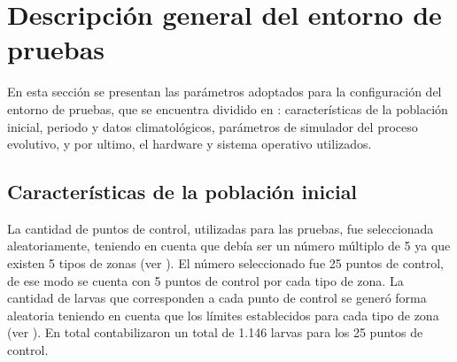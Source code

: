 \section{Descripción general del entorno de pruebas}
En esta sección se presentan las parámetros adoptados para la configuración del entorno de
pruebas, que se encuentra dividido en : características de la población inicial, periodo y datos
climatológicos, parámetros de simulador del proceso evolutivo, y por ultimo, el hardware y sistema
operativo utilizados.

\subsection{Características de la población inicial}
La cantidad de puntos de control, utilizadas para las pruebas, fue seleccionada aleatoriamente,
teniendo en cuenta que debía ser un número múltiplo de 5 ya que existen 5 tipos de zonas
(ver ). El número seleccionado fue 25 puntos de control, de ese
modo se cuenta con 5 puntos de control por cada tipo de zona. La cantidad de larvas que
corresponden a cada punto de control se generó forma aleatoria teniendo en cuenta que los límites
establecidos para cada tipo de zona (ver ). En total contabilizaron
un total de 1.146 larvas para los 25 puntos de control.

